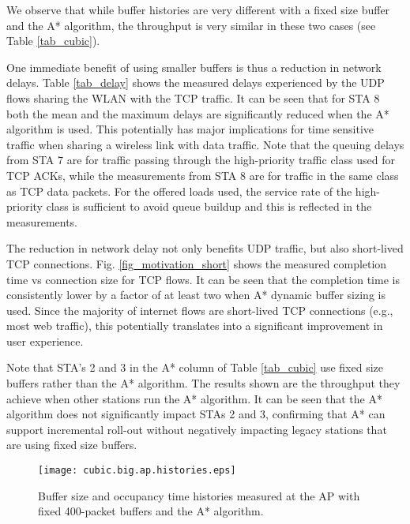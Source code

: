 \documentclass[10pt,twocolumn, journal]{IEEEtran}
\begin{document}
We observe that while buffer histories are very different with a fixed size buffer and the A* algorithm, the throughput is very similar in these two cases (see Table \ref{tab_cubic}).

One immediate benefit of using smaller buffers is thus a reduction in network delays.
Table \ref{tab_delay} shows the measured delays experienced by the UDP flows sharing the WLAN
with the TCP traffic.  It can be seen that for STA 8 both the mean and the maximum delays are
significantly reduced when the A* algorithm is used. This potentially has major
implications for time sensitive traffic when sharing a wireless link with data traffic. Note that the queuing delays from STA 7 are for traffic passing through the high-priority traffic class used for TCP ACKs, while the measurements from STA 8 are for traffic in the same class as TCP data packets.  For the offered loads used, the service rate of the high-priority class is sufficient to avoid queue buildup and this is reflected in the measurements.


The reduction in network delay not only benefits UDP traffic, but also short-lived TCP
connections.   Fig. \ref{fig_motivation_short} shows the measured completion time vs
connection size for TCP flows.  It can be seen that the completion time is consistently lower by a factor of at least two when A* dynamic buffer sizing is used. Since the majority
of internet flows are short-lived TCP connections (e.g., most web traffic), this
potentially translates into a significant improvement in user experience.

Note that STA's 2 and 3 in the A* column of Table \ref{tab_cubic} use fixed size buffers rather than the A* algorithm.   The results shown are the throughput they achieve when other stations run the A* algorithm. It can be seen that the A* algorithm does not significantly impact STAs 2 and 3, confirming that A* can support incremental roll-out without negatively impacting legacy stations that are using fixed size buffers.



\begin{figure}[tb]
    \centering
    \texttt{[image: cubic.big.ap.histories.eps]}
     \caption{Buffer size and occupancy time histories measured at the AP with fixed 400-packet buffers and the A* algorithm.}
    \label{fig_cubic}
\end{figure}
\end{document}
